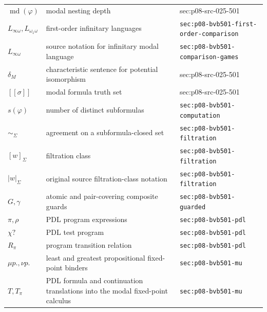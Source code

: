 \begin{longtable}{@{}p{}p{}p{}@{}}
\(\operatorname{md}(\varphi)\) & modal nesting depth & sec:\allowbreak{}p08-\allowbreak{}src-\allowbreak{}025-\allowbreak{}501 \\
\(L_{\infty\omega},\allowbreak L_{\omega_1\omega}\) & first-order infinitary languages & \texttt{sec:\allowbreak{}p08-\allowbreak{}bvb501-\allowbreak{}first-\allowbreak{}order-\allowbreak{}comparison} \\
\(L_{\infty\omega}\) & source notation for infinitary modal language & \texttt{sec:\allowbreak{}p08-\allowbreak{}bvb501-\allowbreak{}comparison-\allowbreak{}games} \\
\(\delta_M\) & characteristic sentence for potential isomorphism & sec:\allowbreak{}p08-\allowbreak{}src-\allowbreak{}025-\allowbreak{}501 \\
\([\![\sigma]\!]\) & modal formula truth set & sec:\allowbreak{}p08-\allowbreak{}src-\allowbreak{}025-\allowbreak{}501 \\
\(s(\varphi)\) & number of distinct subformulas & \texttt{sec:\allowbreak{}p08-\allowbreak{}bvb501-\allowbreak{}computation} \\
\(\sim_\Sigma\) & agreement on a subformula-closed set & \texttt{sec:\allowbreak{}p08-\allowbreak{}bvb501-\allowbreak{}filtration} \\
\([w]_\Sigma\) & filtration class & \texttt{sec:\allowbreak{}p08-\allowbreak{}bvb501-\allowbreak{}filtration} \\
\(\lvert w\rvert_\Sigma\) & original source filtration-class notation & \texttt{sec:\allowbreak{}p08-\allowbreak{}bvb501-\allowbreak{}filtration} \\
\(G,\allowbreak \gamma\) & atomic and pair-covering composite guards & \texttt{sec:\allowbreak{}p08-\allowbreak{}bvb501-\allowbreak{}guarded} \\
\(\pi,\allowbreak \rho\) & PDL program expressions & \texttt{sec:\allowbreak{}p08-\allowbreak{}bvb501-\allowbreak{}pdl} \\
\(\chi?\) & PDL test program & \texttt{sec:\allowbreak{}p08-\allowbreak{}bvb501-\allowbreak{}pdl} \\
\(R_\pi\) & program transition relation & \texttt{sec:\allowbreak{}p08-\allowbreak{}bvb501-\allowbreak{}pdl} \\
\(\mu p.,\allowbreak \nu p.\) & least and greatest propositional fixed-point binders & \texttt{sec:\allowbreak{}p08-\allowbreak{}bvb501-\allowbreak{}mu} \\
\(T,\allowbreak T_\pi\) & PDL formula and continuation translations into the modal fixed-point calculus & \texttt{sec:\allowbreak{}p08-\allowbreak{}bvb501-\allowbreak{}mu} \\

\end{longtable}
